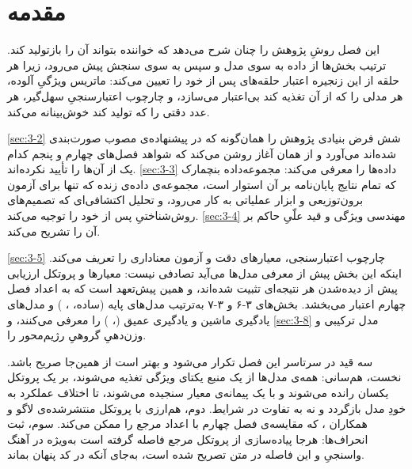 
\section{مقدمه}
\label{sec:3-1}

این فصل روشِ پژوهش را چنان شرح می‌دهد که خواننده بتواند آن را بازتولید کند. ترتیب
بخش‌ها از داده به سوی مدل و سپس به سوی سنجش پیش می‌رود، زیرا هر حلقه از این زنجیره
اعتبار حلقه‌های پس از خود را تعیین می‌کند: ماتریس ویژگیِ آلوده، هر مدلی را که از آن
تغذیه کند بی‌اعتبار می‌سازد، و چارچوب اعتبارسنجیِ سهل‌گیر، هر عدد دقتی را که تولید
کند خوش‌بینانه می‌کند.

\cref{sec:3-2} شش فرض بنیادی پژوهش را  همان‌گونه که در پیشنهاده‌ی مصوب صورت‌بندی
شده‌اند  می‌آورد و از همان آغاز روشن می‌کند که شواهد فصل‌های چهارم و پنجم کدام
یک از آن‌ها را تأیید نکرده‌اند. \cref{sec:3-3} داده‌ها را معرفی می‌کند: مجموعه‌داده بنچمارک
 که تمام نتایج پایان‌نامه بر آن استوار است، مجموعه‌ی داده‌ی زنده که تنها
برای آزمون برون‌توزیعی و ابزار عملیاتی به کار می‌رود، و تحلیل اکتشافی‌ای که
تصمیم‌های روش‌شناختیِ پس از خود را توجیه می‌کند. \cref{sec:3-4} مهندسی ویژگی و قید علّیِ
حاکم بر آن را تشریح می‌کند.

\cref{sec:3-5} چارچوب اعتبارسنجی، معیارهای دقت و آزمون معناداری را تعریف می‌کند. اینکه این
بخش پیش از معرفی مدل‌ها می‌آید تصادفی نیست: معیارها و پروتکل ارزیابی پیش از دیده‌شدن
هر نتیجه‌ای تثبیت شده‌اند، و همین پیش‌تعهد است که به اعداد فصل چهارم اعتبار می‌بخشد.
بخش‌های ۳-۶ و ۳-۷ به‌ترتیب مدل‌های پایه (ساده، ، ) و
مدل‌های یادگیری ماشین و یادگیری عمیق (، ) را معرفی می‌کنند، و
\cref{sec:3-8} مدل ترکیبی و وزن‌دهیِ گروهیِ رژیم‌محور را.

سه قید در سرتاسر این فصل تکرار می‌شود و بهتر است از همین‌جا صریح باشد. نخست،
هم‌سانی: همه‌ی مدل‌ها از یک منبع یکتای ویژگی تغذیه می‌شوند، بر یک پروتکل یکسان رانده
می‌شوند و با یک پیمانه‌ی معیار سنجیده می‌شوند، تا اختلاف عملکرد به خودِ مدل بازگردد و
نه به تفاوت در شرایط. دوم، هم‌ارزی با پروتکل منتشرشده‌ی لاگو و همکاران
\cite{lago_forecasting_2021}، که مقایسه‌ی فصل چهارم با اعداد مرجع را ممکن می‌کند.
سوم، ثبت انحراف‌ها: هرجا پیاده‌سازی از پروتکل مرجع فاصله گرفته است  به‌ویژه در
آهنگ واسنجیِ  و   این فاصله در متن تصریح شده است، به‌جای
آنکه در کد پنهان بماند.
